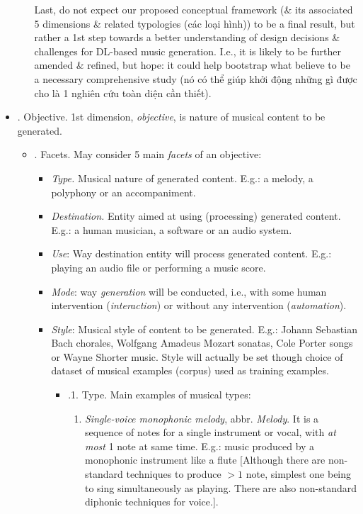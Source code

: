 \documentclass{article}
\begin{document}
\begin{itemize}
\begin{itemize}
		Last, do not expect our proposed conceptual framework (\& its associated 5 dimensions \& related typologies (các loại hình)) to be a final result, but rather a 1st step towards a better understanding of design decisions \& challenges for DL-based music generation. I.e., it is likely to be further amended \& refined, but hope: it could help bootstrap what believe to be a necessary comprehensive study (nó có thể giúp khởi động những gì được cho là 1 nghiên cứu toàn diện cần thiết).
	\end{itemize}
	\item {. Objective.} 1st dimension, {\it objective}, is nature of musical content to be generated.
	\begin{itemize}
		\item {. Facets.} May consider 5 main {\it facets} of an objective:
		\begin{itemize}
			\item {\it Type.} Musical nature of generated content. E.g.: a melody, a polyphony or an accompaniment.
			\item {\it Destination.} Entity aimed at using (processing) generated content. E.g.: a human musician, a software or an audio system.
			\item {\it Use}: Way destination entity will process generated content. E.g.: playing an audio file or performing a music score.
			\item {\it Mode}: way {\it generation} will be conducted, i.e., with some human intervention ({\it interaction}) or without any intervention ({\it automation}).
			\item {\it Style}: Musical style of content to be generated. E.g.: {\sc Johann Sebastian Bach} chorales, {\sc Wolfgang Amadeus Mozart} sonatas, {\sc Cole Porter} songs or {\sc Wayne Shorter} music. Style will actually be set though choice of dataset of musical examples (corpus) used as training examples.
			\begin{itemize}
				\item {.1. Type.} Main examples of musical types:
				\begin{enumerate}
					\item {\it Single-voice monophonic melody}, abbr. {\it Melody}. It is a sequence of notes for a single instrument or vocal, with {\it at most} 1 note at same time. E.g.: music produced by a monophonic instrument like a flute [Although there are non-standard techniques to produce $> 1$ note, simplest one being to sing simultaneously as playing. There are also non-standard diphonic techniques for voice.].

\end{enumerate}
\end{itemize}
\end{itemize}
\end{itemize}
\end{itemize}
\end{document}
